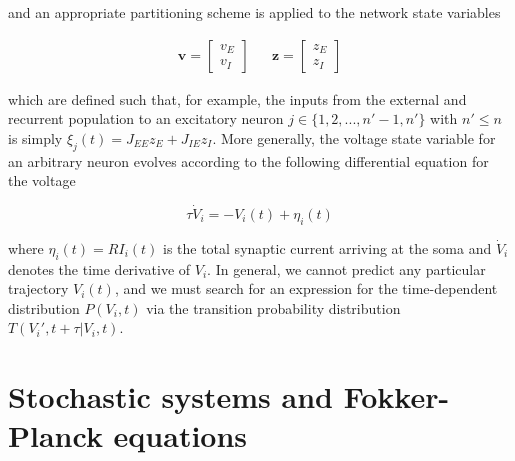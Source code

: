 \documentclass{ucetd}
\begin{document}
and an appropriate partitioning scheme is applied to the network state variables

\begin{align}
\mathbf{v} = \begin{bmatrix}
    v_{E}\\
    v_{I} 
\end{bmatrix}  && \mathbf{z} = \begin{bmatrix}
    z_{E}\\
    z_{I} 
\end{bmatrix} 
\end{align}

which are defined such that, for example, the inputs from the external and recurrent population to an excitatory neuron $j \in \{1, 2, ..., n'-1, n'\}$ with $n' \leq n$ is simply $\xi_{j}(t) = J_{EE}z_{E} + J_{IE}z_{I}$. More generally, the voltage state variable for an arbitrary neuron evolves according to the following differential equation for the voltage

\begin{equation}
\tau\dot{V}_{i} = -V_{i}(t) + \eta_{i}(t)
\end{equation}

where $\eta_{i}(t) = RI_{i}(t)$ is the total synaptic current arriving at the soma and $\dot{V}_{i}$ denotes the time derivative of $V_{i}$.  In general, we cannot predict any particular trajectory $V_{i}(t)$, and we must search for an expression for the time-dependent distribution $P(V_{i}, t)$ via the transition probability distribution $T(V_{i}', t+\tau | V_{i}, t)$.

\section{Stochastic systems and Fokker-Planck equations}
\end{document}

